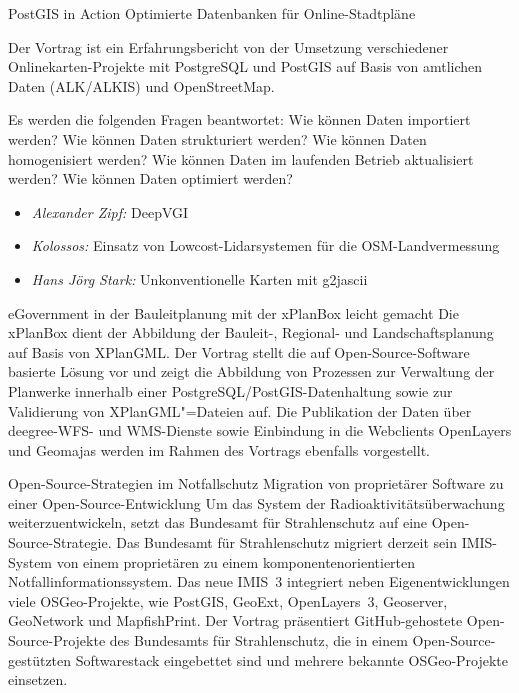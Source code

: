%
{PostGIS in Action}%
{Optimierte Datenbanken für Online-Stadtpläne}%
{Der Vortrag ist ein Erfahrungsbericht von der Umsetzung verschiedener Onlinekarten-Projekte mit
  PostgreSQL und PostGIS auf Basis von amtlichen Daten (ALK/ALKIS) und OpenStreetMap. 

Es werden die folgenden Fragen beantwortet: Wie können Daten importiert werden? Wie können Daten
strukturiert werden? Wie können Daten homogenisiert werden? Wie können Daten im laufenden Betrieb
aktualisiert werden? Wie können Daten optimiert werden?}

%
{%
  \vspace{-2em}
  \begin{itemize}
    \RaggedRight
    \setlength{\itemsep}{-0.25\baselineskip} %
    \item \emph{Alexander Zipf:} DeepVGI
    \item \emph{Kolossos:} Einsatz von Lowcost-Lidarsystemen für die OSM-Landvermessung
    \item \emph{Hans Jörg Stark:} Unkonventionelle Karten mit g2jascii
  \end{itemize}
}


%
{eGovernment in der Bauleitplanung mit der xPlanBox leicht gemacht}%
{}%
{Die xPlanBox dient der Abbildung der Bauleit-, Regional- und Landschaftsplanung auf Basis von
XPlanGML. Der Vortrag stellt die auf Open-Source-Software basierte Lösung vor und zeigt die
Abbildung von Prozessen zur Verwaltung der Planwerke innerhalb einer PostgreSQL/PostGIS-Datenhaltung
sowie zur Validierung von XPlanGML"=Dateien auf. Die Publikation der Daten über deegree-WFS- und
WMS-Dienste sowie Einbindung in die Webclients OpenLayers und Geomajas werden im Rahmen des Vortrags
ebenfalls vorgestellt.}

%
{Open-Source-Strategien im Notfallschutz}%
{Migration von proprietärer Software zu einer Open-Source-Entwicklung}%
{Um das System der Radioaktivitätsüberwachung weiterzuentwickeln, setzt das Bundesamt für
Strahlenschutz auf eine Open-Source-Strategie. Das Bundesamt für Strahlenschutz migriert derzeit sein IMIS-System von
einem proprietären zu einem komponentenorientierten Notfallinformationssystem. Das neue IMIS~3
integriert neben Eigenentwicklungen viele OSGeo-Projekte, wie PostGIS, GeoExt, OpenLayers~3,
Geoserver, GeoNetwork und MapfishPrint. Der Vortrag präsentiert GitHub-gehostete
Open-Source-Projekte des Bundesamts für Strahlenschutz, die in einem
Open-Source-gestützten Softwarestack eingebettet sind und mehrere bekannte
OSGeo-Projekte einsetzen.}


